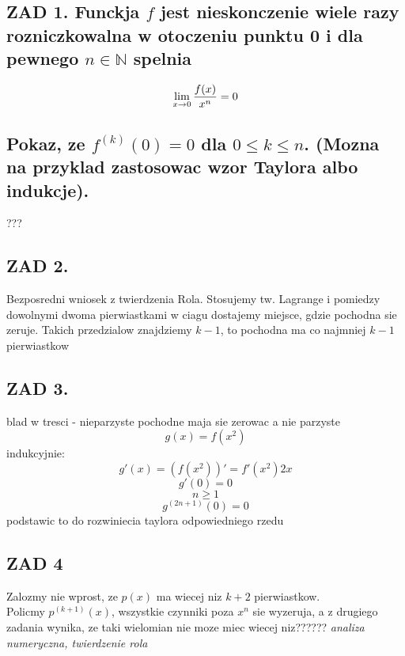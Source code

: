 \documentclass{article}
\newcommand{\N}{\mathbb{N}}
\begin{document}
\pagecolor{back}\color{txt}\ttfamily
\subsection*{\color{tit}ZAD 1. \color{txt}Funckja $f$ jest nieskonczenie wiele razy rozniczkowalna w otoczeniu punktu 0 i dla pewnego $n\in\N$ spelnia}
$$\lim\limits_{x\to0}{f(x)\over x^n}=0$$
\subsection*{Pokaz, ze $f^{(k)}(0)=0$ dla $0\leq k\leq n$. (Mozna na przyklad zastosowac wzor Taylora albo indukcje).}
???
\subsection*{\color{tit}ZAD 2.}
  Bezposredni wniosek z twierdzenia Rola. Stosujemy tw. Lagrange i pomiedzy dowolnymi dwoma pierwiastkami w ciagu dostajemy miejsce, gdzie pochodna sie zeruje. Takich przedzialow znajdziemy $k-1$, to pochodna ma co najmniej $k-1$ pierwiastkow
\subsection*{\color{tit}ZAD 3.}
  blad w tresci - nieparzyste pochodne maja sie zerowac a nie parzyste
  $$g(x)=f(x^2)$$
  indukcyjnie:
  $$g'(x)=(f(x^2))'=f'(x^2)2x$$
  $$g'(0)=0$$
  $$n\geq1$$
  $$g^{(2n+1)}(0)=0$$
  podstawic to do rozwiniecia taylora odpowiedniego rzedu
\subsection*{\color{tit}ZAD 4}
  Zalozmy nie wprost, ze $p(x)$ ma wiecej niz $k+2$ pierwiastkow.\\
  Policmy $p^{(k+1)}(x)$, wszystkie czynniki poza $x^n$ sie wyzeruja, a z drugiego zadania wynika, ze taki wielomian nie moze miec wiecej niz?????? \emph{analiza numeryczna, twierdzenie rola}
\end{document}
